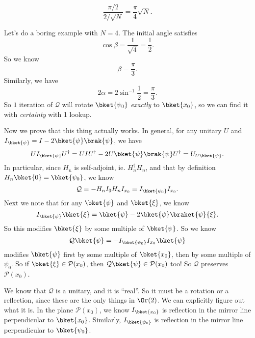 \documentclass[a4paper]{article}
\begin{document}
\[
  \frac{\pi/2}{2/\sqrt{N}} = \frac{\pi}{4} \sqrt{N}.
\]
\begin{eg}
  Let's do a boring example with $N = 4$. The initial angle satisfies
  \[
    \cos \beta = \frac{1}{\sqrt{4}} = \frac{1}{2}.
  \]
  So we know
  \[
    \beta = \frac{\pi}{3}.
  \]
  Similarly, we have
  \[
    2\alpha = 2 \sin^{-1}\frac{1}{2} = \frac{\pi}{3}.
  \]
  So $1$ iteration of $\mathcal{Q}$ will rotate $\bket{\psi_0}$ \emph{exactly} to $\bket{x_0}$, so we can find it with \emph{certainty} with 1 lookup.
\end{eg}
Now we prove that this thing actually works. In general, for any unitary $U$ and $I_{\bket{\psi}} = I - 2 \bket{\psi}\brak{\psi}$, we have
\[
  UI_{\bket{\psi}}U^\dagger = UIU^\dagger - 2U \bket{\psi} \brak{\psi} U^\dagger = U_{U \bket{\psi}}.
\]
In particular, since $H_n$ is self-adjoint, ie. $H_n^\dagger H_n$, and that by definition $H_n \bket{0} = \bket{\psi_0}$, we know
\[
  \mathcal{Q} = -H_n I_0 H_n I_{x_0} = I_{\bket{\psi_0}} I_{x_0}.
\]
Next we note that for any $\bket{\psi}$ and $\bket{\xi}$, we know
\[
  I_{\bket{\psi}}\bket{\xi} = \bket{\psi} - 2 \bket{\psi} \braket{\psi}{\xi}.
\]
So this modifies $\bket{\xi}$ by some multiple of $\bket{\psi}$. So we know
\[
  \mathcal{Q}\bket{\psi} = -I_{\bket{\psi_0}} I_{x_0}\bket{\psi}
\]
modifies $\bket{\psi}$ first by some multiple of $\bket{x_0}$, then by some multiple of $\psi_0$. So if $\bket{\xi} \in \mathcal{P}(x_0)$, then $\mathcal{Q} \bket{\psi} \in \mathcal{P}(x_0)$ too! So $\mathcal{Q}$ preserves $\mathcal{P}(x_0)$.

We know that $\mathcal{Q}$ is a unitary, and it is ``real''. So it must be a rotation or a reflection, since these are the only things in $\Or(2)$. We can explicitly figure out what it is. In the plane $\mathcal{P}(x_0)$, we know $I_{\bket{x_0}}$ is reflection in the mirror line perpendicular to $\bket{x_0}$. Similarly, $I_{\bket{\psi_0}}$ is reflection in the mirror line perpendicular to $\bket{\psi_0}$.
\end{document}

